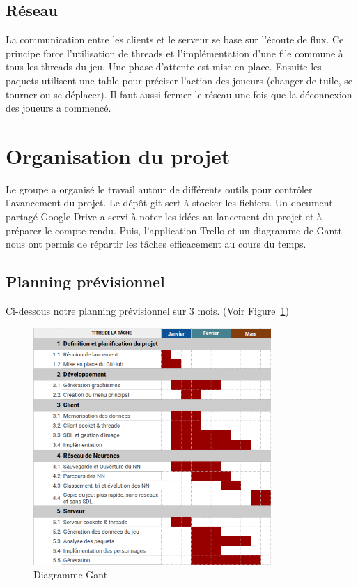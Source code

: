 \documentclass[11pt]{article}
\begin{document}
        \subsection{Réseau}
        La communication entre les clients et le serveur se base sur l'écoute de flux.
        Ce principe force l'utilisation de threads et l'implémentation d'une file commune à tous les threads du jeu.
        Une phase d'attente est mise en place.
        Ensuite les paquets utilisent une table pour préciser l'action des joueurs (changer de tuile, se tourner ou se déplacer).
        Il faut aussi fermer le réseau une fois que la déconnexion des joueurs a commencé.


   
    \section{Organisation du projet}
    Le groupe a organisé le travail autour de différents outils pour contrôler l’avancement du projet. Le dépôt git sert à stocker les fichiers. Un document partagé Google Drive a servi à noter les idées au lancement du projet et à préparer le compte-rendu. Puis, l’application Trello et un diagramme de Gantt nous ont permis de répartir les tâches efficacement au cours du temps.

        \subsection{Planning prévisionnel}
        Ci-dessous notre planning prévisionnel sur 3 mois. (Voir Figure~\ref{fig:Gant})
        \begin{figure}[H]
            \begin{center}
                \includegraphics[height=9cm]{gant.png}
                \caption{Diagramme Gant}
                \label{fig:Gant} 
            \end{center}
        \end{figure}
\end{document}

